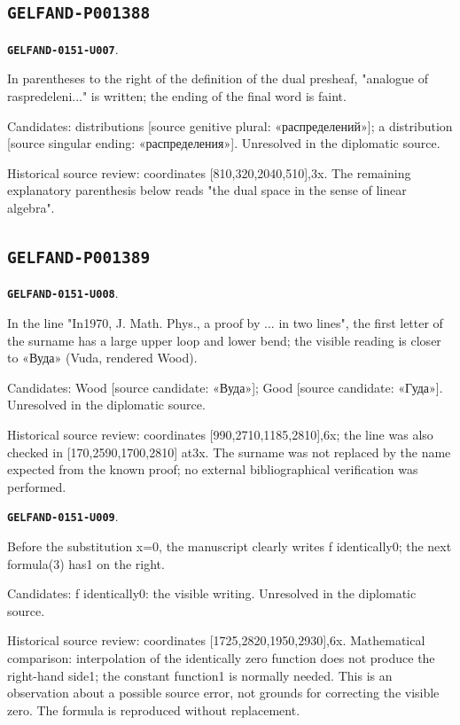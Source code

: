 \documentclass[11pt]{article}
\theoremstyle{definition}
\theoremstyle{remark}
\begin{document}
\subsection*{\texttt{GELFAND-P001388}}
\par\noindent\leavevmode{}\label{GELFAND-0151-U007}\label{GELFAND-P001388:dual-note:note}\textbf{\texttt{GELFAND-0151-U007}}.\nopagebreak[4]\par
In parentheses to the right of the definition of the dual presheaf, "analogue of raspredeleni..." is written; the ending of the final word is faint.\par
Candidates: distributions [source genitive plural: «распределений»]; a distribution [source singular ending: «распределения»]. Unresolved in the diplomatic source.\par
Historical source review: coordinates [810,320,2040,510],3x. The remaining explanatory parenthesis below reads "the dual space in the sense of linear algebra".\par\medskip
\subsection*{\texttt{GELFAND-P001389}}
\par\noindent\leavevmode{}\label{GELFAND-0151-U008}\label{GELFAND-P001389:author-name:note}\textbf{\texttt{GELFAND-0151-U008}}.\nopagebreak[4]\par
In the line "In1970, J. Math. Phys., a proof by ... in two lines", the first letter of the surname has a large upper loop and lower bend; the visible reading is closer to «Вуда» (Vuda, rendered Wood).\par
Candidates: Wood [source candidate: «Вуда»]; Good [source candidate: «Гуда»]. Unresolved in the diplomatic source.\par
Historical source review: coordinates [990,2710,1185,2810],6x; the line was also checked in [170,2590,1700,2810] at3x. The surname was not replaced by the name expected from the known proof; no external bibliographical verification was performed.\par\medskip
\par\noindent\leavevmode{}\label{GELFAND-0151-U009}\label{GELFAND-P001389:interpolation-function:note}\textbf{\texttt{GELFAND-0151-U009}}.\nopagebreak[4]\par
Before the substitution x=0, the manuscript clearly writes f identically0; the next formula(3) has1 on the right.\par
Candidates: f identically0: the visible writing. Unresolved in the diplomatic source.\par
Historical source review: coordinates [1725,2820,1950,2930],6x. Mathematical comparison: interpolation of the identically zero function does not produce the right-hand side1; the constant function1 is normally needed. This is an observation about a possible source error, not grounds for correcting the visible zero. The formula is reproduced without replacement.\par\medskip
\end{document}
